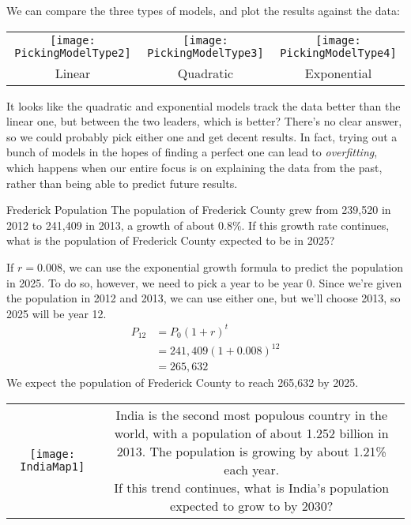 We can compare the three types of models, and plot the results against the data:
\begin{center}
\begin{tabular}{c c c}
\texttt{[image: PickingModelType2]}
& \texttt{[image: PickingModelType3]}
& \texttt{[image: PickingModelType4]}\\
Linear & Quadratic & Exponential
\end{tabular}
\end{center}

It looks like the quadratic and exponential models track the data better than the linear one, but between the two leaders, which is better?  There's no clear answer, so we could probably pick either one and get decent results.  In fact, trying out a bunch of models in the hopes of finding a perfect one can lead to \emph{overfitting}, which happens when our entire focus is on explaining the data from the past, rather than being able to predict future results.
\pagebreak

\begin{example}[https://www.youtube.com/watch?v=NHLi7ekPSPM]{Frederick Population}
The population of Frederick County grew from 239,520 in 2012 to 241,409 in 2013, a growth of about 0.8\%.  If this growth rate continues, what is the population of Frederick County expected to be in 2025?

\solline
{}
If $r=0.008$, we can use the exponential growth formula to predict the population in 2025.  To do so, however, we need to pick a year to be year 0.  Since we're given the population in 2012 and 2013, we can use either one, but we'll choose 2013, so 2025 will be year 12.
\begin{align*}
P_{12} &= P_0 (1+r)^t\\
&= 241,409(1+0.008)^{12}\\
&= \boxed{265,632}
\end{align*}
We expect the population of Frederick County to reach 265,632 by 2025.
\end{example}

\begin{try}
\begin{tabular}{c c}
\texttt{[image: IndiaMap1]} & 
\parbox[b]{2.5in}{India is the second most populous country in the world, with a population of about 1.252 billion in 2013.  The population is growing by about 1.21\% each year.\\

If this trend continues, what is India's population expected to grow to by 2030?}
\end{tabular}
\end{try}

